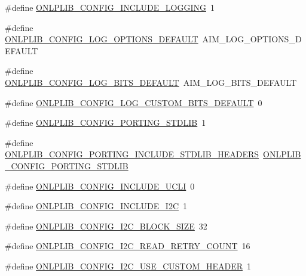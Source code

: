 \begin{DoxyCompactItemize}
\item 
\#define \hyperlink{group__onlplib-config_gad8175cd4116cb1e3ea0758836c119cbc}{O\+N\+L\+P\+L\+I\+B\+\_\+\+C\+O\+N\+F\+I\+G\+\_\+\+I\+N\+C\+L\+U\+D\+E\+\_\+\+L\+O\+G\+G\+I\+N\+G}~1
\item 
\#define \hyperlink{group__onlplib-config_ga2a6ff3d7d9eb360374a05258bd9d0027}{O\+N\+L\+P\+L\+I\+B\+\_\+\+C\+O\+N\+F\+I\+G\+\_\+\+L\+O\+G\+\_\+\+O\+P\+T\+I\+O\+N\+S\+\_\+\+D\+E\+F\+A\+U\+L\+T}~A\+I\+M\+\_\+\+L\+O\+G\+\_\+\+O\+P\+T\+I\+O\+N\+S\+\_\+\+D\+E\+F\+A\+U\+L\+T
\item 
\#define \hyperlink{group__onlplib-config_ga1db2ad2b4c0400580ff0afa4e63858b6}{O\+N\+L\+P\+L\+I\+B\+\_\+\+C\+O\+N\+F\+I\+G\+\_\+\+L\+O\+G\+\_\+\+B\+I\+T\+S\+\_\+\+D\+E\+F\+A\+U\+L\+T}~A\+I\+M\+\_\+\+L\+O\+G\+\_\+\+B\+I\+T\+S\+\_\+\+D\+E\+F\+A\+U\+L\+T
\item 
\#define \hyperlink{group__onlplib-config_gabd8ec32f33cf910c6ca556473f7b0d6f}{O\+N\+L\+P\+L\+I\+B\+\_\+\+C\+O\+N\+F\+I\+G\+\_\+\+L\+O\+G\+\_\+\+C\+U\+S\+T\+O\+M\+\_\+\+B\+I\+T\+S\+\_\+\+D\+E\+F\+A\+U\+L\+T}~0
\item 
\#define \hyperlink{group__onlplib-config_ga302f795ad8b5a94d7106a09fa43c33fb}{O\+N\+L\+P\+L\+I\+B\+\_\+\+C\+O\+N\+F\+I\+G\+\_\+\+P\+O\+R\+T\+I\+N\+G\+\_\+\+S\+T\+D\+L\+I\+B}~1
\item 
\#define \hyperlink{group__onlplib-config_ga8e32626fe42db3048ce8866d15551a82}{O\+N\+L\+P\+L\+I\+B\+\_\+\+C\+O\+N\+F\+I\+G\+\_\+\+P\+O\+R\+T\+I\+N\+G\+\_\+\+I\+N\+C\+L\+U\+D\+E\+\_\+\+S\+T\+D\+L\+I\+B\+\_\+\+H\+E\+A\+D\+E\+R\+S}~\hyperlink{group__onlplib-config_ga302f795ad8b5a94d7106a09fa43c33fb}{O\+N\+L\+P\+L\+I\+B\+\_\+\+C\+O\+N\+F\+I\+G\+\_\+\+P\+O\+R\+T\+I\+N\+G\+\_\+\+S\+T\+D\+L\+I\+B}
\item 
\#define \hyperlink{group__onlplib-config_ga20f364c8998cfb22bfc8cbf0a7932133}{O\+N\+L\+P\+L\+I\+B\+\_\+\+C\+O\+N\+F\+I\+G\+\_\+\+I\+N\+C\+L\+U\+D\+E\+\_\+\+U\+C\+L\+I}~0
\item 
\#define \hyperlink{group__onlplib-config_gaf4e7be22bed4fe886ed9f2f0f888eff2}{O\+N\+L\+P\+L\+I\+B\+\_\+\+C\+O\+N\+F\+I\+G\+\_\+\+I\+N\+C\+L\+U\+D\+E\+\_\+\+I2\+C}~1
\item 
\#define \hyperlink{group__onlplib-config_ga866d8aa98da341583de0a79c0f8ea06f}{O\+N\+L\+P\+L\+I\+B\+\_\+\+C\+O\+N\+F\+I\+G\+\_\+\+I2\+C\+\_\+\+B\+L\+O\+C\+K\+\_\+\+S\+I\+Z\+E}~32
\item 
\#define \hyperlink{group__onlplib-config_gab5ad0583ab6038e0f03e82a969ed1909}{O\+N\+L\+P\+L\+I\+B\+\_\+\+C\+O\+N\+F\+I\+G\+\_\+\+I2\+C\+\_\+\+R\+E\+A\+D\+\_\+\+R\+E\+T\+R\+Y\+\_\+\+C\+O\+U\+N\+T}~16
\item 
\#define \hyperlink{group__onlplib-config_gac9796fabefa4088a6ce94204a9834063}{O\+N\+L\+P\+L\+I\+B\+\_\+\+C\+O\+N\+F\+I\+G\+\_\+\+I2\+C\+\_\+\+U\+S\+E\+\_\+\+C\+U\+S\+T\+O\+M\+\_\+\+H\+E\+A\+D\+E\+R}~1
\end{DoxyCompactItemize}
